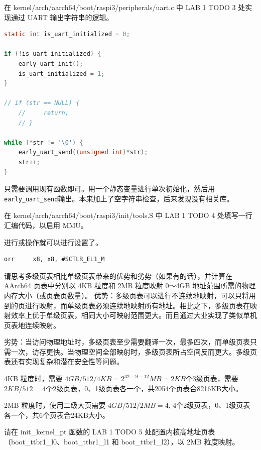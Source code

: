 \documentclass{article}
\newcommand{\customthmname}{}
\newenvironment{prob}[1]
{\renewcommand{\customthmname}{#1}%
	\innercustomthm}
{\endinnercustomthm}
\begin{document}
	\begin{prob}{练习题}
		在 kernel/arch/aarch64/boot/raspi3/peripherals/uart.c 中 LAB 1 TODO 3 处实现通过 UART 输出字符串的逻辑。
	\end{prob}

	\begin{lstlisting}[style=armasm, language=C]
static int is_uart_initialized = 0;

if (!is_uart_initialized) {
	early_uart_init();
	is_uart_initialized = 1;
}

// if (str == NULL) {
	//     return;
	// }

while (*str != '\0') {
	early_uart_send((unsigned int)*str);
	str++;
}
	\end{lstlisting}

	只需要调用现有函数即可。用一个静态变量进行单次初始化，然后用\texttt{early\_uart\_send}输出。本来加上了空字符串检查，后来发现没有相关库。
	
	\begin{prob}{练习题}
		在 kernel/arch/aarch64/boot/raspi3/init/tools.S 中 LAB 1 TODO 4 处填写一行汇编代码，以启用 MMU。
	\end{prob}

	进行或操作就可以进行设置了。
	\begin{lstlisting}[style=armasm]
	orr     x8, x8, #SCTLR_EL1_M
	\end{lstlisting}

	\begin{prob}{思考题}
		请思考多级页表相比单级页表带来的优势和劣势（如果有的话），并计算在 AArch64 页表中分别以 4KB 粒度和 2MB 粒度映射 0～4GB 地址范围所需的物理内存大小（或页表页数量）。
	\end{prob}
	优势：多级页表可以进行不连续地映射，可以只将用到的页进行映射，而单级页表必须连续地映射所有地址。相比之下，多级页表在映射效率上优于单级页表，相同大小可映射范围更大。而且通过大业实现了类似单机页表地连续映射。

	劣势：当访问物理地址时，多级页表至少需要翻译一次，最多四次，而单级页表只需一次，访存更快。当物理空间全部映射时，多级页表所占空间反而更大。多级页表还有实现复杂和潜在安全性等问题。
	
	4KB 粒度时，需要 $4GB/512/4KB=2^{32-9-12}MB=2KB$个3级页表，需要$2KB/512=4$个2级页表，0、1级页表各一个，共2054个页表合8216KB大小。
	
	2MB 粒度时，使用二级大页需要 $4GB/512/2MB=4$, 4个2级页表，0、1级页表各一个，共6个页表合24KB大小。
	
	\begin{prob}{练习题}
		请在 init\_kernel\_pt 函数的 LAB 1 TODO 5 处配置内核高地址页表（boot\_ttbr1\_l0、boot\_ttbr1\_l1 和 boot\_ttbr1\_l2），以 2MB 粒度映射。
	\end{prob}
\end{document}
